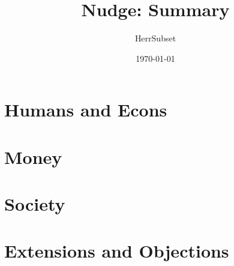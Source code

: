 \documentclass[a4paper]{article}
\date{\today}
\title{Nudge: Summary}
\author{HerrSubset}
\begin{document}
\maketitle
\newpage
\tableofcontents
\newpage




\part{Humans and Econs}

\part{Money}

\part{Society}

\part{Extensions and Objections}
\end{document}
